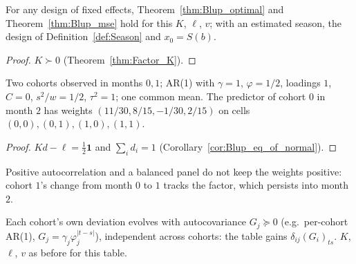 \begin{corollary}\label{cor:Factor_blup}
  \leanok
  For any design of fixed effects, Theorem~\ref{thm:Blup_optimal} and
  Theorem~\ref{thm:Blup_mse} hold for this $K$, $\ell$, $v$; with an estimated season, the
  design of Definition~\ref{def:Season} and $x_0 = S(b)$.
\end{corollary}
\begin{proof}
  \leanok
  $K \succ 0$ (Theorem~\ref{thm:Factor_K}).
\end{proof}

\begin{theorem}\label{thm:Factor_neg}
  \leanok
  Two cohorts observed in months $0, 1$; AR(1) with $\gamma = 1$, $\varphi = 1/2$, loadings $1$,
  $C = 0$, $s^2/w = 1/2$, $\tau^2 = 1$; one common mean. The predictor of cohort $0$ in month
  $2$ has weights $(11/30, 8/15, -1/30, 2/15)$ on cells $(0,0), (0,1), (1,0), (1,1)$.
\end{theorem}
\begin{proof}
  \leanok
  $Kd - \ell = \tfrac12\mathbf 1$ and $\sum_i d_i = 1$
  (Corollary~\ref{cor:Blup_eq_of_normal}).
\end{proof}

\begin{remark}[Finding 25]\label{rem:factor_neg}
  Positive autocorrelation and a balanced panel do not keep the weights positive: cohort $1$'s
  change from month $0$ to $1$ tracks the factor, which persists into month $2$.
\end{remark}

\begin{definition}\label{def:Factor_card}
  \leanok
  Each cohort's own deviation evolves with autocovariance $G_j \succeq 0$ (e.g.\ per-cohort
  AR(1), $G_j = \gamma_j\varphi_j^{|t-s|}$), independent across cohorts: the table gains
  $\delta_{ij}(G_i)_{ts}$. $K$, $\ell$, $v$ as before for this table.
\end{definition}

